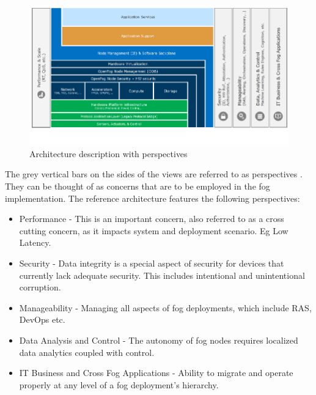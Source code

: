 \documentclass{article}
\begin{document}
\begin{figure}[H]
	\centering
	\includegraphics[scale=0.5]{figa.png}
	\caption{Architecture description with perspectives \cite{openfogconsortium2017}}
	\label{fig:openfog_ra}
\end{figure} 

The grey vertical bars on the sides of the views are referred to as perspectives \cite{openfogconsortium2017}. They can be thought of as concerns that are to be employed in the fog implementation. The reference architecture features the following perspectives:

\begin{itemize}
\item Performance - This is an important concern, also referred to as a cross cutting concern, as it impacts system and deployment scenario. Eg Low Latency.

\item Security - Data integrity is a special aspect of security for devices that currently lack adequate security. This includes intentional and unintentional corruption\cite{openfogconsortium2017}.

\item Manageability - Managing all aspects of fog deployments, which include RAS, DevOps etc\cite{openfogconsortium2017}. 

\item Data Analysis and Control -  The autonomy of fog nodes requires localized data analytics coupled with control\cite{openfogconsortium2017}.

\item IT Business and Cross Fog Applications - Ability to migrate and operate properly at any level of a fog deployment’s hierarchy\cite{openfogconsortium2017}.  
\end{itemize}
\end{document}
